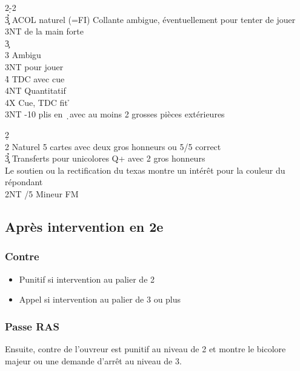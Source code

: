 \documentclass[a4paper]{article}
\begin{document}
\begin{bidtable}
2\d-2\h\\
3\c\d\h\s \> ACOL naturel (=FI) Collante ambigue, éventuellement pour tenter de jouer 3NT de la main forte\+\\
3\c\+\\
3\s \> Ambigu\+\\
3NT \> pour jouer\+\\
4\h \> TDC avec cue \s \\
4NT \> Quantitatif\-\-\\
4X \> Cue, TDC fit \h \-\\
3NT -10 plis en \d\ avec au moins 2 grosses pièces extérieures\-
\end{bidtable}

\begin{bidtable}
2\d\+\\
2\s \> Naturel 5 cartes avec deux gros honneurs ou 5/5 correct\\
3\c\d\h\s \> Transferts pour unicolores Q+ avec 2 gros honneurs\\
\>Le soutien ou la rectification du texas montre un intérêt pour la couleur du répondant\\
2NT /5 Mineur FM\-
\end{bidtable}

\subsection{Après intervention en 2e}

\subsubsection{Contre}

\begin{itemize}
\item Punitif si intervention au palier de 2

\item Appel si intervention au palier de 3 ou plus

\end{itemize}

\subsubsection{Passe RAS}

Ensuite, contre de l'ouvreur est punitif au niveau de 2 et montre le bicolore majeur ou une demande d'arrêt au niveau de 3.
\end{document}
